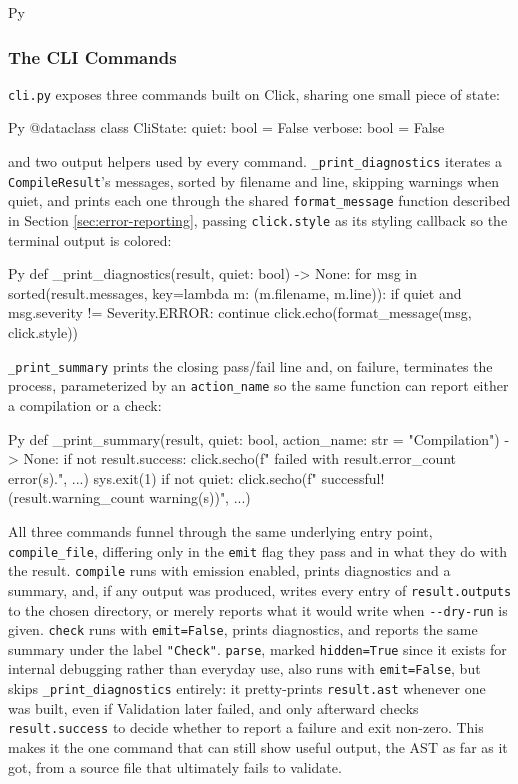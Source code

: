 \begin{codeblock}[]{Py}
\subsubsection{The CLI Commands}
\lstinline|cli.py| exposes three commands built on Click, sharing one small piece of state:
\begin{codeblock}[]{Py}
@dataclass
class CliState:
    quiet:   bool = False
    verbose: bool = False
\end{codeblock}
and two output helpers used by every command. \lstinline|_print_diagnostics| iterates a \lstinline|CompileResult|'s messages, sorted by filename and line, skipping warnings when quiet, and prints each one through the shared \lstinline|format_message| function described in Section \ref{sec:error-reporting}, passing \lstinline|click.style| as its styling callback so the terminal output is colored:
\begin{codeblock}[]{Py}
def _print_diagnostics(result, quiet: bool) -> None:
    for msg in sorted(result.messages, key=lambda m: (m.filename, m.line)):
        if quiet and msg.severity != Severity.ERROR:
            continue
        click.echo(format_message(msg, click.style))
\end{codeblock}
\lstinline|_print_summary| prints the closing pass/fail line and, on failure, terminates the process, parameterized by an \lstinline|action_name| so the same function can report either a compilation or a check:
\begin{codeblock}[]{Py}
def _print_summary(result, quiet: bool, action_name: str = "Compilation") -> None:
    if not result.success:
        click.secho(f" failed with {result.error_count} error(s).", ...)
        sys.exit(1)
    if not quiet:
        click.secho(f" successful! ({result.warning_count} warning(s))", ...)
\end{codeblock}

All three commands funnel through the same underlying entry point, \lstinline|compile_file|, differing only in the \lstinline|emit| flag they pass and in what they do with the result. \lstinline|compile| runs with emission enabled, prints diagnostics and a summary, and, if any output was produced, writes every entry of \lstinline|result.outputs| to the chosen directory, or merely reports what it would write when \lstinline|--dry-run| is given. \lstinline|check| runs with \lstinline|emit=False|, prints diagnostics, and reports the same summary under the label \lstinline|"Check"|. \lstinline|parse|, marked \lstinline|hidden=True| since it exists for internal debugging rather than everyday use, also runs with \lstinline|emit=False|, but skips \lstinline|_print_diagnostics| entirely: it pretty-prints \lstinline|result.ast| whenever one was built, even if Validation later failed, and only afterward checks \lstinline|result.success| to decide whether to report a failure and exit non-zero. This makes it the one command that can still show useful output, the AST as far as it got, from a source file that ultimately fails to validate.


\end{codeblock}
